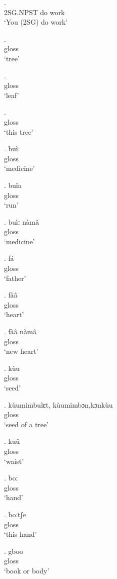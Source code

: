 \documentclass{assets/fieldnotes}
\begin{document}
\exg.  \\
2SG.NPST do work \\
`You (2SG) do work'


\exg.  \\
gloss \\
`tree'

\exg.  \\
gloss \\
`leaf'

\exg.  \\
gloss \\
`this tree'

\exg. buìː \\
gloss \\
`medicine'

\exg. buîa \\
gloss \\
`run'

\exg. buìː nàmâ \\
gloss \\
`medicine'

\exg. fá \\
gloss \\
`father'

\exg. fàâ \\
gloss \\
`heart'

\exg. fàâ nàmâ\\
gloss \\
`new heart'

\exg. kùu \\
gloss\\ %
`seed'

\exg. kùumimbulɛt, kùumimbɔn,kɔnkùu \\
gloss \\
`seed of a tree'

\exg. kuû \\
gloss \\
`waist'

\exg. boː \\
gloss \\
`hand'

\exg. boːtʃ⁠e  \\
gloss \\
`this hand'

\exg. gboo \\
gloss \\
`book or body'
\end{document}
